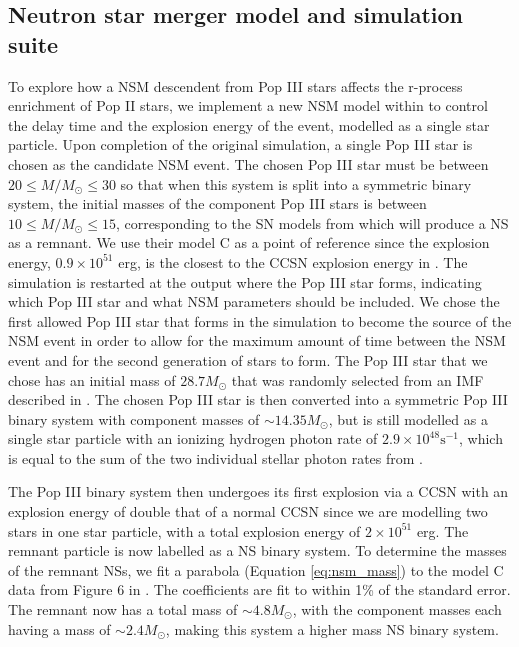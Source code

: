 \documentclass[fleqn,usenatbib]{mnras}
\begin{document}
\subsection{Neutron star merger model and simulation suite} \label{sec:NSM_model}
To explore how a NSM descendent from Pop III stars affects the r-process enrichment of Pop II stars, we implement a new NSM model within \enzo{} to control the delay time and the explosion energy of the event, modelled as a single star particle. Upon completion of the original simulation, a single Pop III star is chosen as the candidate NSM event. The chosen Pop III star must be between $20 \leq M / M_{\odot} \leq 30$ so that when this system is split into a symmetric binary system, the initial masses of the component Pop III stars is between $10 \leq M / M_{\odot} \leq 15$, corresponding to the SN models from \citet{Heger10} which will produce a NS as a remnant. We use their model C as a point of reference since the explosion energy, $0.9 \times 10^{51}$ erg, is the closest to the CCSN explosion energy in \enzo{}. The simulation is restarted at the output where the Pop III star forms, indicating which Pop III star and what NSM parameters should be included. We chose the first allowed Pop III star that forms in the simulation to become the source of the NSM event in order to allow for the maximum amount of time between the NSM event and for the second generation of stars to form. The Pop III star that we chose has an initial mass of $28.7 M_{\odot}$ that was randomly selected from an IMF described in \citet{Skinner20}. The chosen Pop III star is then converted into a symmetric Pop III binary system with component masses of $\sim 14.35 M_{\odot}$, but is still modelled as a single star particle with an ionizing hydrogen photon rate of $2.9 \times 10^{48} \mathrm{s}^{-1}$, which is equal to the sum of the two individual stellar photon rates from \citet{Schaerer02}.

The Pop III binary system then undergoes its first explosion via a CCSN with an explosion energy of double that of a normal CCSN since we are modelling two stars in one star particle, with a total explosion energy of $2 \times 10^{51}$ erg. The remnant particle is now labelled as a NS binary system. To determine the masses of the remnant NSs, we fit a parabola (Equation \ref{eq:nsm_mass}) to the model C data from Figure 6 in \citet{Heger10}. The coefficients are fit to within 1\% of the standard error. The remnant now has a total mass of $\sim 4.8 M_{\odot}$, with the component masses each having a mass of $\sim 2.4 M_{\odot}$, making this system a higher mass NS binary system.
\end{document}
